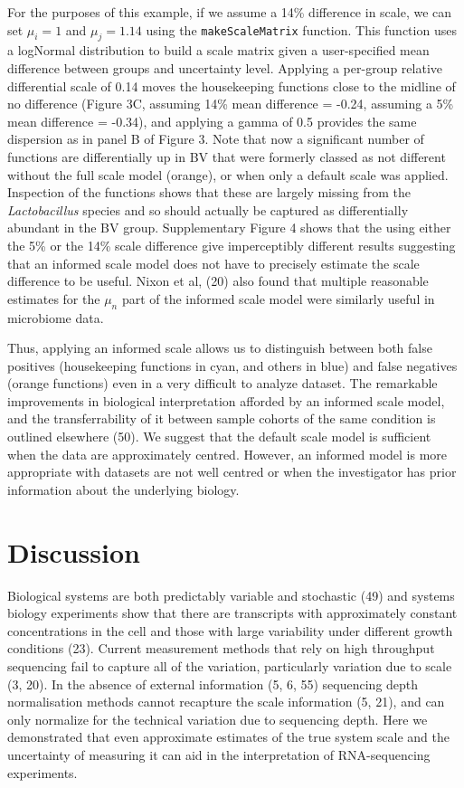 \documentclass[
]{article}
\begin{document}
For the purposes of this example, if we assume a 14\% difference in
scale, we can set \(\mu_i = 1\) and \(\mu_j = 1.14\) using the
\texttt{makeScaleMatrix} function. This function uses a logNormal
distribution to build a scale matrix given a user-specified mean
difference between groups and uncertainty level. Applying a per-group
relative differential scale of 0.14 moves the housekeeping functions
close to the midline of no difference (Figure 3C, assuming 14\% mean
difference = -0.24, assuming a 5\% mean difference = -0.34), and
applying a gamma of 0.5 provides the same dispersion as in panel B of
Figure 3. Note that now a significant number of functions are
differentially up in BV that were formerly classed as not different
without the full scale model (orange), or when only a default scale was
applied. Inspection of the functions shows that these are largely
missing from the \emph{Lactobacillus} species and so should actually be
captured as differentially abundant in the BV group. Supplementary
Figure 4 shows that the using either the 5\% or the 14\% scale
difference give imperceptibly different results suggesting that an
informed scale model does not have to precisely estimate the scale
difference to be useful. Nixon et al, (20) also found that multiple
reasonable estimates for the \(\mu_n\) part of the informed scale model
were similarly useful in microbiome data.

Thus, applying an informed scale allows us to distinguish between both
false positives (housekeeping functions in cyan, and others in blue) and
false negatives (orange functions) even in a very difficult to analyze
dataset. The remarkable improvements in biological interpretation
afforded by an informed scale model, and the transferrability of it
between sample cohorts of the same condition is outlined elsewhere (50).
We suggest that the default scale model is sufficient when the data are
approximately centred. However, an informed model is more appropriate
with datasets are not well centred or when the investigator has prior
information about the underlying biology.

\section{Discussion}\label{discussion}

Biological systems are both predictably variable and stochastic (49) and
systems biology experiments show that there are transcripts with
approximately constant concentrations in the cell and those with large
variability under different growth conditions (23). Current measurement
methods that rely on high throughput sequencing fail to capture all of
the variation, particularly variation due to scale (3, 20). In the
absence of external information (5, 6, 55) sequencing depth
normalisation methods cannot recapture the scale information (5, 21),
and can only normalize for the technical variation due to sequencing
depth. Here we demonstrated that even approximate estimates of the true
system scale and the uncertainty of measuring it can aid in the
interpretation of RNA-sequencing experiments.
\end{document}
